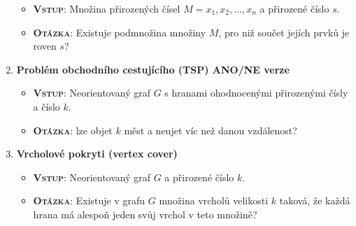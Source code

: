 \begin{enumerate}
\begin{itemize}
		\item \textbf{\textsc{Vstup}}: Množina přirozených čísel $ M = {x_1, x_2, \ldots, x_n} $ a přirozené číslo $ s $.
		\item \textbf{\textsc{Otázka}}: Existuje podmnožina množiny $ M $, pro niž součet jejích prvků je roven $ s $?
	\end{itemize}
	\item \textbf{Problém obchodního cestujícího (TSP) ANO/NE verze}
	\begin{itemize}
		\item \textbf{\textsc{Vstup}}: Neorientovaný graf $ G $ s hranami ohodnocenými přirozenými čísly a číslo $ k $.
		\item \textbf{\textsc{Otázka}}: lze objet $k$ měst a neujet víc než danou vzdálenost?
	\end{itemize}
	\item \textbf{Vrcholové pokryti (vertex cover)}
	\begin{itemize}
		\item \textbf{\textsc{Vstup}}: Neorientovaný graf $ G $ a přirozené číslo $ k $.
		\item \textbf{\textsc{Otázka}}: Existuje v grafu $ G $ množina vrcholů velikosti $ k $ taková, že každá hrana má alespoň jeden svůj vrchol v teto množině?
	\end{itemize}
\end{enumerate}
